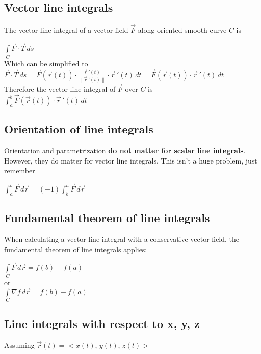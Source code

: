 \documentclass[12pt, letterpaper]{article}
\begin{document}
  \subsection*{Vector line integrals}
  The vector line integral of a vector field \(\vec{F}\) along oriented smooth curve \(C\) is 
  \begin{center}
    \( \int \limits_C \vec{F} \cdot \vec{T}\,ds \) \\
    Which can be simplified to \\
    \( \vec{F} \cdot \vec{T}\,ds = \vec{F}(\vec{r}(t)) \cdot \frac{\vec{r}\,'(t)}{\|\vec{r}\,'(t)\|} \cdot \vec{r}\,'(t)\,dt = \vec{F}(\vec{r}(t)) \cdot \vec{r}\,'(t)\,dt\) \\
    Therefore the vector line integral of \(\vec{F}\) over \(C\) is \\
    \( \int_{a}^{b} \vec{F}(\vec{r}(t)) \cdot \vec{r}\,'(t)\,dt \)
  \end{center}

  \subsection*{Orientation of line integrals}
  Orientation and parametrization \textbf{do not matter for scalar line integrals}. \\

  \noindent However, they do matter for vector line integrals. This isn't a huge problem, just remember

  \begin{center}
    \(\int_{a}^{b}\vec{F}\,d\vec{r} = (-1)\int_{b}^{a} \vec{F}\,  d\vec{r} \)
  \end{center}

\pagebreak

  \subsection*{Fundamental theorem of line integrals}
  When calculating a vector line integral with a conservative vector field, the fundamental theorem of line integrals applies: 

  \begin{center}
    \(\int \limits_C \vec{F} \, d\vec{r} = f(b) - f(a)\) \\
    or \\
    \(\int \limits_C \nabla f \, d\vec{r} = f(b) - f(a)\) 
  \end{center}

  \subsection*{Line integrals with respect to x, y, z}
  Assuming \(\vec{r}(t) = <x(t),\,y(t),\,z(t)>\)
\end{document}
